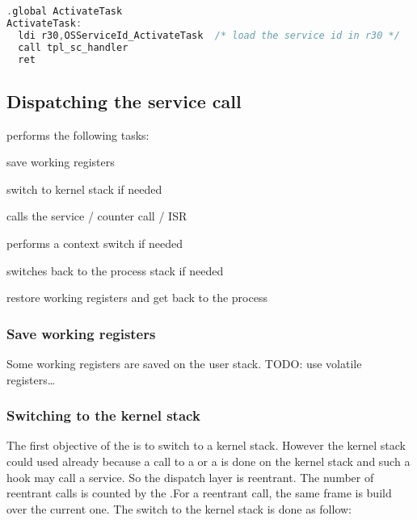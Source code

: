 \begin{lstlisting}[language=C]
  .global ActivateTask
ActivateTask:
  ldi r30,OSServiceId_ActivateTask  /* load the service id in r30 */
  call tpl_sc_handler
  ret
\end{lstlisting}

%

\subsection{Dispatching the service call}

 performs the following tasks:
\begin{penum}
\item save working registers
\item switch to kernel stack if needed
\item calls the service / counter call / ISR
\item performs a context switch if needed
\item switches back to the process stack if needed
\item restore working registers and get back to the process
\end{penum}

\subsubsection{Save working registers}
Some working registers are saved on the user stack. TODO: use volatile registers…

\subsubsection{Switching to the kernel stack}
The first objective of the  is to switch to a kernel stack. However the kernel stack could used already because a call to a  or a  is done on the kernel stack and such a hook may call a service. So the dispatch layer is reentrant. The number of reentrant calls is counted by the .For a reentrant call, the same frame is build over the current one. The switch to the kernel stack is done as follow:

